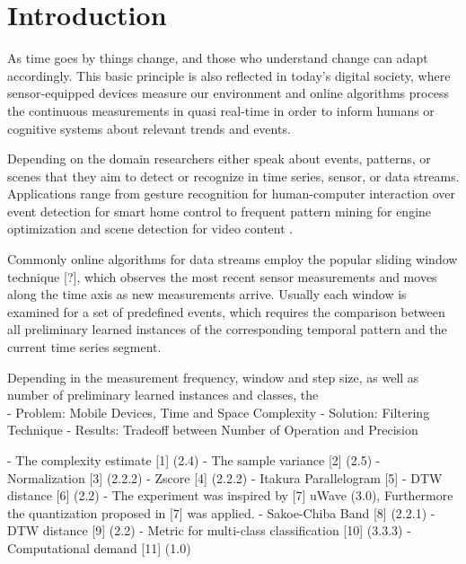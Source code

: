 \newpage
\section{Introduction} \label{introduction}

As time goes by things change, and those who understand change can adapt accordingly. This basic principle is also reflected in today's digital society, where sensor-equipped devices measure our environment and online algorithms process the continuous measurements in quasi real-time in order to inform humans or cognitive systems about relevant trends and events. 

Depending on the domain researchers either speak about events, patterns, or scenes that they aim to detect or recognize in time series, sensor, or data streams. Applications range from gesture recognition for human-computer interaction \cite{liu2009uwave} over event detection for smart home control \cite{spiegel2015metering} to frequent pattern mining for engine optimization \cite{spiegel2015driving} and scene detection for video content \cite{acar2011mediaeval}.

Commonly online algorithms for data streams employ the popular sliding window technique [?], which observes the most recent sensor measurements and moves along the time axis as new measurements arrive. Usually each window is examined for a set of predefined events, which requires the comparison between all preliminary learned instances of the corresponding temporal pattern and the current time series segment.

Depending in the measurement frequency, window and step size, as well as number of preliminary learned instances and classes, the  \\

- Problem: Mobile Devices, Time and Space Complexity
- Solution: Filtering Technique
- Results: Tradeoff between Number of Operation and Precision




- The complexity estimate [1] (2.4)
- The sample variance [2] (2.5)
- Normalization [3] (2.2.2)
- Zscore [4] (2.2.2)
- Itakura Parallelogram [5]
- DTW distance [6] (2.2)
- The experiment was inspired by [7] uWave (3.0), Furthermore the quantization proposed in [7] was applied.
- Sakoe-Chiba Band [8] (2.2.1)
- DTW distance [9] (2.2)
- Metric for multi-class classification [10] (3.3.3)
- Computational demand [11] (1.0)





